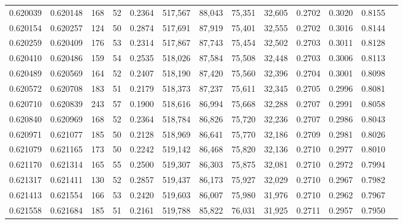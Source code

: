 \begin{tabular}{rrrrrrrrrrrrr}
0.620039 & 0.620148 &   168 &  52 &                                     0.2364 & 517,567 &  88,043 &  75,351 &  32,605 & 0.2702 & 0.3020 & 0.8155 \\
0.620154 & 0.620257 &   124 &  50 &                                     0.2874 & 517,691 &  87,919 &  75,401 &  32,555 & 0.2702 & 0.3016 & 0.8144 \\
0.620259 & 0.620409 &   176 &  53 &                                     0.2314 & 517,867 &  87,743 &  75,454 &  32,502 & 0.2703 & 0.3011 & 0.8128 \\
0.620410 & 0.620486 &   159 &  54 &                                     0.2535 & 518,026 &  87,584 &  75,508 &  32,448 & 0.2703 & 0.3006 & 0.8113 \\
0.620489 & 0.620569 &   164 &  52 &                                     0.2407 & 518,190 &  87,420 &  75,560 &  32,396 & 0.2704 & 0.3001 & 0.8098 \\
0.620572 & 0.620708 &   183 &  51 &                                     0.2179 & 518,373 &  87,237 &  75,611 &  32,345 & 0.2705 & 0.2996 & 0.8081 \\
0.620710 & 0.620839 &   243 &  57 &                                     0.1900 & 518,616 &  86,994 &  75,668 &  32,288 & 0.2707 & 0.2991 & 0.8058 \\
0.620840 & 0.620969 &   168 &  52 &                                     0.2364 & 518,784 &  86,826 &  75,720 &  32,236 & 0.2707 & 0.2986 & 0.8043 \\
0.620971 & 0.621077 &   185 &  50 &                                     0.2128 & 518,969 &  86,641 &  75,770 &  32,186 & 0.2709 & 0.2981 & 0.8026 \\
0.621079 & 0.621165 &   173 &  50 &                                     0.2242 & 519,142 &  86,468 &  75,820 &  32,136 & 0.2710 & 0.2977 & 0.8010 \\
0.621170 & 0.621314 &   165 &  55 &                                     0.2500 & 519,307 &  86,303 &  75,875 &  32,081 & 0.2710 & 0.2972 & 0.7994 \\
0.621317 & 0.621411 &   130 &  52 &                                     0.2857 & 519,437 &  86,173 &  75,927 &  32,029 & 0.2710 & 0.2967 & 0.7982 \\
0.621413 & 0.621554 &   166 &  53 &                                     0.2420 & 519,603 &  86,007 &  75,980 &  31,976 & 0.2710 & 0.2962 & 0.7967 \\
0.621558 & 0.621684 &   185 &  51 &                                     0.2161 & 519,788 &  85,822 &  76,031 &  31,925 & 0.2711 & 0.2957 & 0.7950 \\

\end{tabular}
